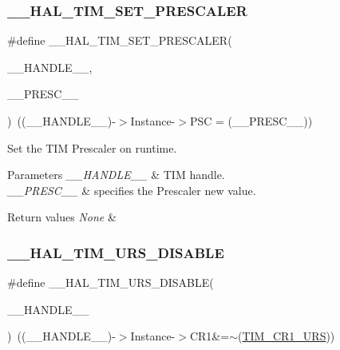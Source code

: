 \subsubsection{\texorpdfstring{\+\_\+\+\_\+\+H\+A\+L\+\_\+\+T\+I\+M\+\_\+\+S\+E\+T\+\_\+\+P\+R\+E\+S\+C\+A\+L\+ER}{\_\_HAL\_TIM\_SET\_PRESCALER}}
{\footnotesize\ttfamily \#define \+\_\+\+\_\+\+H\+A\+L\+\_\+\+T\+I\+M\+\_\+\+S\+E\+T\+\_\+\+P\+R\+E\+S\+C\+A\+L\+ER(\begin{DoxyParamCaption}\item[{}]{\+\_\+\+\_\+\+H\+A\+N\+D\+L\+E\+\_\+\+\_\+,  }\item[{}]{\+\_\+\+\_\+\+P\+R\+E\+S\+C\+\_\+\+\_\+ }\end{DoxyParamCaption})~((\+\_\+\+\_\+\+H\+A\+N\+D\+L\+E\+\_\+\+\_\+)-\/$>$Instance-\/$>$P\+SC = (\+\_\+\+\_\+\+P\+R\+E\+S\+C\+\_\+\+\_\+))}



Set the T\+IM Prescaler on runtime. 


\begin{DoxyParams}{Parameters}
{\em \+\_\+\+\_\+\+H\+A\+N\+D\+L\+E\+\_\+\+\_\+} & T\+IM handle. \\
\hline
{\em \+\_\+\+\_\+\+P\+R\+E\+S\+C\+\_\+\+\_\+} & specifies the Prescaler new value. \\
\hline
\end{DoxyParams}

\begin{DoxyRetVals}{Return values}
{\em None} & \\
\hline
\end{DoxyRetVals}
\mbox{\label{group___t_i_m___exported___macros_gafacb551a4c537e62a0fe740b2f12236c}} 
\subsubsection{\texorpdfstring{\+\_\+\+\_\+\+H\+A\+L\+\_\+\+T\+I\+M\+\_\+\+U\+R\+S\+\_\+\+D\+I\+S\+A\+B\+LE}{\_\_HAL\_TIM\_URS\_DISABLE}}
{\footnotesize\ttfamily \#define \+\_\+\+\_\+\+H\+A\+L\+\_\+\+T\+I\+M\+\_\+\+U\+R\+S\+\_\+\+D\+I\+S\+A\+B\+LE(\begin{DoxyParamCaption}\item[{}]{\+\_\+\+\_\+\+H\+A\+N\+D\+L\+E\+\_\+\+\_\+ }\end{DoxyParamCaption})~((\+\_\+\+\_\+\+H\+A\+N\+D\+L\+E\+\_\+\+\_\+)-\/$>$Instance-\/$>$C\+R1\&=$\sim$(\mbox{\hyperlink{group___peripheral___registers___bits___definition_ga06c997c2c23e8bef7ca07579762c113b}{T\+I\+M\+\_\+\+C\+R1\+\_\+\+U\+RS}}))}



